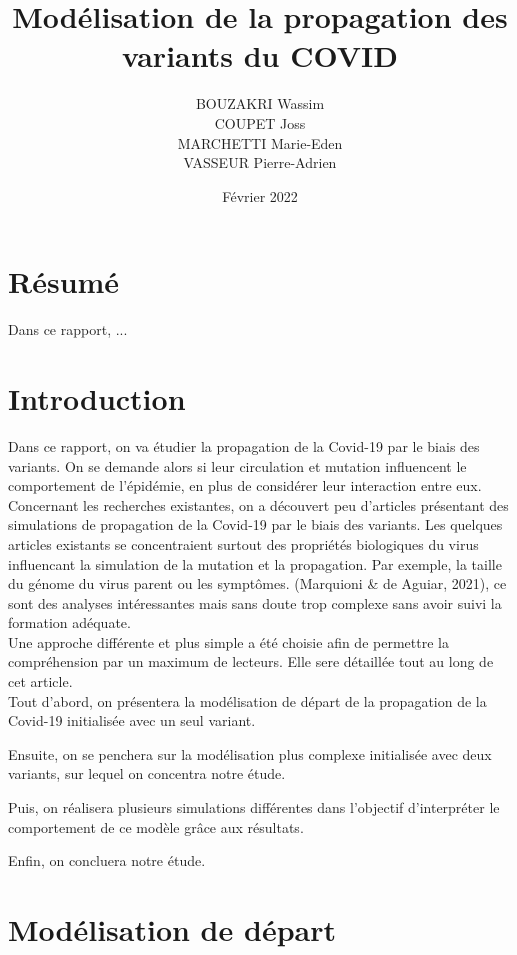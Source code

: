 \documentclass{article}
\title{Modélisation de la propagation des variants du COVID}
\author{BOUZAKRI Wassim \\COUPET Joss \\MARCHETTI Marie-Eden \\VASSEUR Pierre-Adrien}
\date{Février 2022}
\begin{document}
\maketitle

\section{Résumé}

Dans ce rapport, ...

\section{Introduction}

Dans ce rapport, on va étudier la propagation de la Covid-19 par le biais des variants.
On se demande alors si leur circulation et mutation influencent le comportement de l'épidémie, en plus de considérer leur interaction entre eux.\\

\noindent
Concernant les recherches existantes, on a découvert peu d'articles présentant des simulations de propagation de la Covid-19 par le biais des variants.
Les quelques articles existants se concentraient surtout des propriétés biologiques du virus influencant la simulation de la mutation et la propagation.
Par exemple, la taille du génome du virus parent ou les symptômes. (Marquioni \& de Aguiar, 2021), ce sont des analyses intéressantes mais sans doute trop complexe sans avoir suivi la formation adéquate.\\

\noindent
Une approche différente et plus simple a été choisie afin de permettre la compréhension par un maximum de lecteurs. Elle sere détaillée tout au long de cet article.\\

\noindent
Tout d'abord, on présentera la modélisation de départ de la propagation de la Covid-19 initialisée avec un seul variant. \par
Ensuite, on se penchera sur la modélisation plus complexe initialisée avec deux variants, sur lequel on concentra notre étude.\par
Puis, on réalisera plusieurs simulations différentes dans l'objectif d'interpréter le comportement de ce modèle grâce aux résultats.\par
Enfin, on concluera notre étude.\\

\section{Modélisation de départ}
\end{document}
